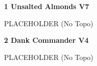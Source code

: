 \begin{multicols*}{2}
					\label{rt:Unsalted Almonds} \colorbox{Goldenrod!50}{\textbf{1 Unsalted Almonds V7  }}
					\begin{adjustwidth}{1cm}{}
					PLACEHOLDER
						\newline (No Topo) 
					\end{adjustwidth}
					\label{rt:Dank Commander} \colorbox{RoyalBlue!20}{\textbf{2 Dank Commander V4  }}
					\begin{adjustwidth}{1cm}{}
					PLACEHOLDER
						\newline (No Topo) 
					\end{adjustwidth}
\end{multicols*}
\clearpage
